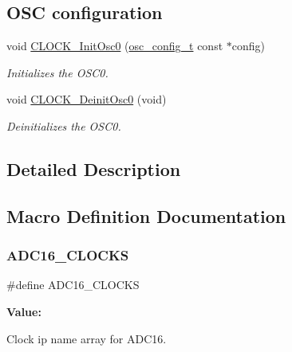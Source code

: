 \subsection*{O\+SC configuration}
\begin{DoxyCompactItemize}
\item 
void \mbox{\hyperlink{group__clock_ga7fd566b301526150b4e2be076006029f}{C\+L\+O\+C\+K\+\_\+\+Init\+Osc0}} (\mbox{\hyperlink{group__clock_ga7b42afca82c7234da7c1ccd5fc4d984b}{osc\+\_\+config\+\_\+t}} const $\ast$config)
\begin{DoxyCompactList}\small\item\em Initializes the O\+S\+C0. \end{DoxyCompactList}\item 
void \mbox{\hyperlink{group__clock_ga559f868eef1e9d1e37450a57ce4902af}{C\+L\+O\+C\+K\+\_\+\+Deinit\+Osc0}} (void)
\begin{DoxyCompactList}\small\item\em Deinitializes the O\+S\+C0. \end{DoxyCompactList}\end{DoxyCompactItemize}


\subsection{Detailed Description}


\subsection{Macro Definition Documentation}
\mbox{\label{group__clock_ga222774f8b22a83bd1d4bde253be13eba}} 
\subsubsection{\texorpdfstring{ADC16\_CLOCKS}{ADC16\_CLOCKS}}
{\footnotesize\ttfamily \#define A\+D\+C16\+\_\+\+C\+L\+O\+C\+KS}

{\bfseries Value\+:}
\begin{DoxyCode}{0}
\DoxyCodeLine{\{                \(\backslash\)}
\DoxyCodeLine{    \}}

\end{DoxyCode}


Clock ip name array for A\+D\+C16. 

